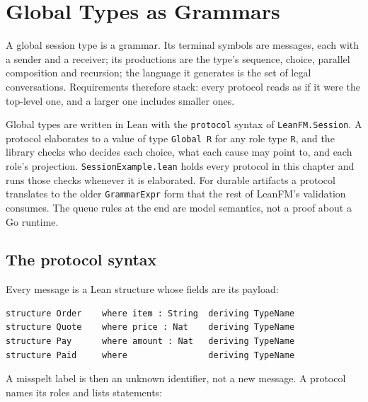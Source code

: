 \chapter{Global Types as Grammars}
\label{ch:grammar}

A global session type is a grammar. Its terminal symbols are messages, each with
a sender and a receiver; its productions are the type's sequence, choice,
parallel composition and recursion; the language it generates is the set of
legal conversations. Requirements therefore stack: every protocol reads as if it
were the top-level one, and a larger one includes smaller ones.

Global types are written in Lean with the \texttt{protocol} syntax of
\texttt{LeanFM.Session}. A protocol elaborates to a value of type
\texttt{Global R} for any role type \texttt{R}, and the library checks who decides
each choice, what each cause may point to, and each role's projection.
\texttt{SessionExample.lean} holds every protocol in this chapter and runs those
checks whenever it is elaborated. For durable artifacts a protocol translates to
the older \texttt{GrammarExpr} form that the rest of LeanFM's validation consumes.
The queue rules at the end are model semantics, not a proof about a Go runtime.

\section{The protocol syntax}

Every message is a Lean structure whose fields are its payload:

\begin{lstlisting}
structure Order    where item : String  deriving TypeName
structure Quote    where price : Nat    deriving TypeName
structure Pay      where amount : Nat   deriving TypeName
structure Paid     where                deriving TypeName
\end{lstlisting}

A misspelt label is then an unknown identifier, not a new message. A protocol
names its roles and lists statements:



